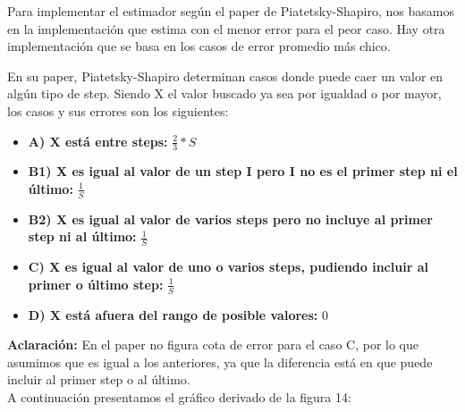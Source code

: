 \quad Para implementar el estimador seg\'un el paper de Piatetsky-Shapiro, nos basamos en la implementaci\'on que estima con el menor error para el peor caso. Hay otra implementaci\'on que se basa en los casos  de error promedio m\'as chico.

\quad En su paper, Piatetsky-Shapiro determinan casos donde puede caer un valor en alg\'un tipo de step. Siendo X el valor buscado ya sea por igualdad o por mayor, los casos y sus errores son los siguientes: \\

\begin{itemize}
\item \textbf{A) X est\'a entre steps:} \quad $ \frac{2}{3} * S$ \\

\item \textbf{B1) X es igual al valor de un step I pero I no es el primer step ni el \'ultimo:} \quad $ \frac{1}{S} $ \\

\item \textbf{B2) X es igual al valor de varios steps pero no incluye al primer step ni al \'ultimo:} \quad $ \frac{1}{S} $ \\

\item \textbf{C) X es igual al valor de uno o varios steps, pudiendo incluir al primer o \'ultimo step:} \quad $ \frac{1}{S} $ \\

\item \textbf{D) X est\'a afuera del rango de posible valores:} \quad $ 0 $ \\
\end{itemize}

\textbf{Aclaraci\'on:} \quad En el paper no figura cota de error para el caso C, por lo que asumimos que es igual a los anteriores, ya que la diferencia est\'a en que puede incluir al primer step o al \'ultimo. \\

\quad A continuaci\'on presentamos el gr\'afico derivado de la figura 14: \\

